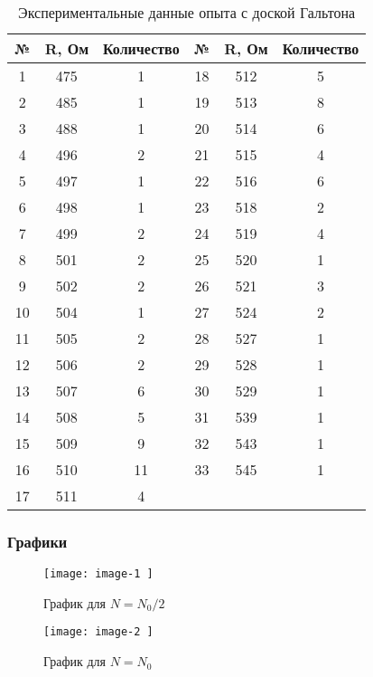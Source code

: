 \begin{center}
	\begin{longtable}{|c|c|c||c|c|c|}
		\caption[Экспериментальные данные опыта с доской Гальтона]{Экспериментальные данные опыта с доской Гальтона} \label{ap:table:3} \\
		\hline
		\multicolumn{1}{|c|}{\textbf{№}} &
		\multicolumn{1}{c|}{\textbf{R, Ом}} & 
		\multicolumn{1}{c||}{\textbf{Количество}} &
		\multicolumn{1}{c|}{\textbf{№}} &
		\multicolumn{1}{c|}{\textbf{R, Ом}} & 
		\multicolumn{1}{c|}{\textbf{Количество}} \\ \hline
		\endfirsthead
		
		1  & 475 & 1  & 18 & 512 & 5 \\ \hline
		2  & 485 & 1  & 19 & 513 & 8 \\ \hline
		3  & 488 & 1  & 20 & 514 & 6 \\ \hline
		4  & 496 & 2  & 21 & 515 & 4 \\ \hline
		5  & 497 & 1  & 22 & 516 & 6 \\ \hline
		6  & 498 & 1  & 23 & 518 & 2 \\ \hline
		7  & 499 & 2  & 24 & 519 & 4 \\ \hline
		8  & 501 & 2  & 25 & 520 & 1 \\ \hline
		9  & 502 & 2  & 26 & 521 & 3 \\ \hline
		10 & 504 & 1  & 27 & 524 & 2 \\ \hline
		11 & 505 & 2  & 28 & 527 & 1 \\ \hline
		12 & 506 & 2  & 29 & 528 & 1 \\ \hline
		13 & 507 & 6  & 30 & 529 & 1 \\ \hline
		14 & 508 & 5  & 31 & 539 & 1 \\ \hline
		15 & 509 & 9  & 32 & 543 & 1 \\ \hline
		16 & 510 & 11 & 33 & 545 & 1 \\ \hline
		17 & 511 & 4  &    &     &   \\ \hline
		
		
	\end{longtable}
\end{center}


\subsubsection{Графики}


\begin{figure}[ht] 
	
	\texttt{[image:  image-1 ]} \label{image_1}
	\centering
	\caption{График для $N = N_0/2$}
	\centering
\end{figure}

\begin{figure}[h] \label{image_2}
	
	\texttt{[image:  image-2 ]}
	\centering
	\caption{График для $N = N_0$}
	\centering
\end{figure}